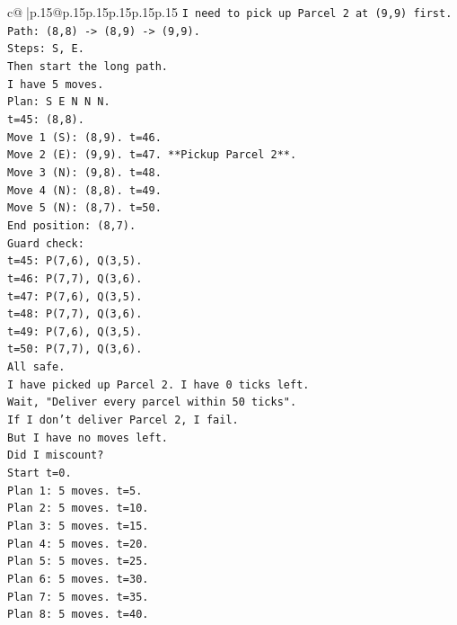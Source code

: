 \documentclass{article}
\begin{document}
{\begin{supertabular}{c@{$\;$}|p{.15\linewidth}@{}p{.15\linewidth}p{.15\linewidth}p{.15\linewidth}p{.15\linewidth}p{.15\linewidth}}
{{{\texttt{I need to pick up Parcel 2 at (9,9) first.} \\
\texttt{Path: (8,8) {-}> (8,9) {-}> (9,9).} \\
\texttt{Steps: S, E.} \\
\texttt{Then start the long path.} \\
\texttt{I have 5 moves.} \\
\texttt{Plan: S E N N N.} \\
\texttt{t=45: (8,8).} \\
\texttt{Move 1 (S): (8,9). t=46.} \\
\texttt{Move 2 (E): (9,9). t=47. **Pickup Parcel 2**.} \\
\texttt{Move 3 (N): (9,8). t=48.} \\
\texttt{Move 4 (N): (8,8). t=49.} \\
\texttt{Move 5 (N): (8,7). t=50.} \\
\texttt{End position: (8,7).} \\
\texttt{Guard check:} \\
\texttt{t=45: P(7,6), Q(3,5).} \\
\texttt{t=46: P(7,7), Q(3,6).} \\
\texttt{t=47: P(7,6), Q(3,5).} \\
\texttt{t=48: P(7,7), Q(3,6).} \\
\texttt{t=49: P(7,6), Q(3,5).} \\
\texttt{t=50: P(7,7), Q(3,6).} \\
\texttt{All safe.} \\
\texttt{I have picked up Parcel 2. I have 0 ticks left.} \\
\texttt{Wait, "Deliver every parcel within 50 ticks".} \\
\texttt{If I don't deliver Parcel 2, I fail.} \\
\texttt{But I have no moves left.} \\
\texttt{Did I miscount?} \\
\texttt{Start t=0.} \\
\texttt{Plan 1: 5 moves. t=5.} \\
\texttt{Plan 2: 5 moves. t=10.} \\
\texttt{Plan 3: 5 moves. t=15.} \\
\texttt{Plan 4: 5 moves. t=20.} \\
\texttt{Plan 5: 5 moves. t=25.} \\
\texttt{Plan 6: 5 moves. t=30.} \\
\texttt{Plan 7: 5 moves. t=35.} \\
\texttt{Plan 8: 5 moves. t=40.} \\
}}}
\end{supertabular}}
\end{document}
